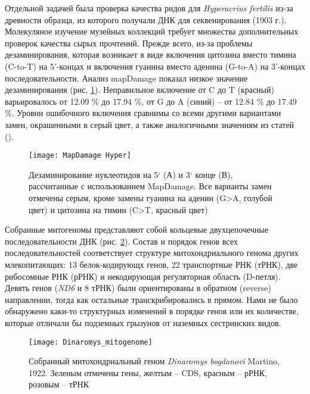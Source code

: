 
Отдельной задачей была проверка качества ридов для \textit{Hyperacrius fertilis} из-за древности образца, из которого получали ДНК для секвенирования (1903 г.). Молекуляное изучение музейных коллекций требует множества дополнительных проверок качества сырых прочтений. Прежде всего, из-за проблемы дезаминирования, которая возникает в виде включения цитозина вместо тимина (C-to-T) на 5'-концах и включения гуанина вместо аденина (G-to-A) на 3'-концах последовательности. Анализ mapDamage показал низкое значение дезаминирования (рис. \ref{MapDamage}). Неправильное включение от C до T (красный) варьировалось от 12.09 \% до 17.94 \%, от G до A (синий) -- от 12.84 \% до 17.49 \%. Уровни ошибочного включения сравнимы со всеми другими вариантами замен, окрашенными в серый цвет, а также аналогичными значениям из статей (\cite{Molto2017}).


\begin{figure}[h!]
	\begin{center}
		\texttt{[image: MapDamage Hyper]}
	\end{center}
	\caption{Дезаминирование нуклеотидов на 5` (А) и 3` конце (В), рассчитанные с использованием MapDamage. Все варианты замен отмечены серым, кроме замены гуанина на аденин (G>A, голубой цвет) и цитозина на тимин (C>T, красный цвет)}\label{MapDamage}
\end{figure}


Собранные митогеномы представляют собой кольцевые двухцепочечные последовательности ДНК (рис. \ref{mitogenome}). Состав и порядок генов всех последовательностей соответствует структуре митохондриального генома других млекопитающих: 13 белок-кодирующх генов, 22 транспортные РНК (тРНК), две рибосомные РНК (рРНК) и некодирующая регуляторная область (D-петля). Девять генов (\textit{ND6} и 8 тРНК) были ориентированы в обратном (reverse) направлении, тогда как остальные транскрибировались в прямом. Нами не было обнаружено каки-то структурных изменений в порядке генов или их количестве, которые отличали бы подземных грызунов от наземных сестринских видов.

\begin{figure}[h!]
	\begin{center}
		\texttt{[image: Dinaromys\_mitogenome]}
	\end{center}
	\caption{Собранный митохондриальный геном \textit{Dinaromys bogdanovi} Martino, 1922. Зеленым отмечены гены, желтым -- CDS, красным -- рРНК, розовым -- тРНК}\label{mitogenome}
\end{figure}

